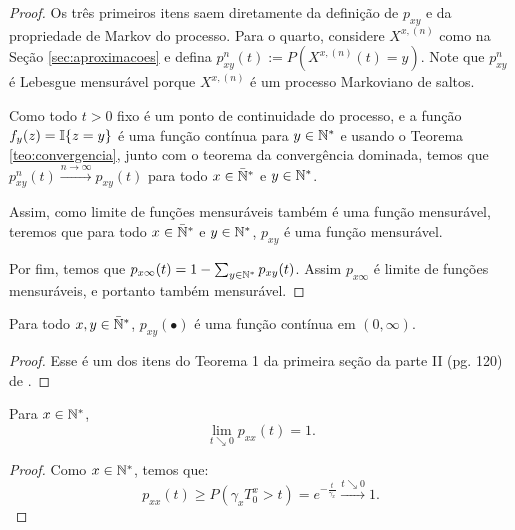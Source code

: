 \begin{proof}
  Os três primeiros itens saem diretamente da definição de $p_{x y}$ e
  da propriedade de Markov do processo. Para o quarto, considere
  $X^{x, (n)}$ como na Seção \ref{sec:aproximacoes} e defina $p^n_{x
    y}(t) := P(X^{x, (n)}(t) = y)$. Note que $p^n_{xy}$ é Lebesgue
  mensurável porque $X^{x, (n)}$ é um processo Markoviano de saltos.

  Como todo $t > 0$ fixo é \qc um ponto de continuidade do processo, e
  a função $f_y(z) = {\mathbb{I}}\{ z = y \}$ é uma função contínua para $y
  \in {\mathbb{N^*}}$ e usando o Teorema \ref{teo:convergencia}, junto com o
  teorema da convergência dominada, temos que $p_{x y}^n(t)
  \xrightarrow{n\to\infty} p_{x y}(t)$ para todo $x \in {\mathbb{\bar{N}^*}}$ e $y \in
  {\mathbb{N^*}}$. 

  Assim, como limite de funções mensuráveis também é uma função
  mensurável, teremos que para todo $x \in {\mathbb{\bar{N}^*}}$ e $y \in {\mathbb{N^*}}$, $p_{x
    y}$ é uma função mensurável.

  Por fim, temos que $p_{x \infty} (t) = 1 - \sum_{y \in {\mathbb{N^*}}} p_{x y}
  (t)$. Assim $p_{x \infty}$ é limite de funções mensuráveis, e
  portanto também mensurável.
\end{proof}

\begin{proposicao}
  \label{prop:transicao-continua}
  Para todo $x, y \in {\mathbb{\bar{N}^*}}$, $p_{x y}(\bullet)$ é uma função contínua
  em $(0, \infty)$.
\end{proposicao} 

\begin{proof}
  Esse é um dos itens do Teorema 1 da primeira seção da parte II
  (pg. 120) de \cite{chung:67}.
\end{proof}

\begin{proposicao}
  \label{prop:continuidade-facil}
  Para $x \in {\mathbb{N^*}}$,
  \begin{equation}
    \lim_{t \searrow 0}p_{xx}(t) = 1.   
  \end{equation}
\end{proposicao}
\begin{proof}
  Como $x \in {\mathbb{N^*}}$, temos que:
  \begin{displaymath}
    p_{xx}(t) \geq P( \gamma_x T^x_0 > t) = e^{-\frac{t}{\gamma_x}}
    \xrightarrow{t \searrow 0} 1.
  \end{displaymath}
\end{proof}


